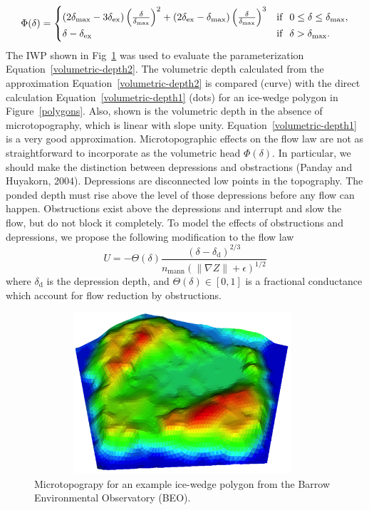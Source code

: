 \documentclass[review,11pt]{elsarticle}
\begin{document}
\begin{equation}\label{volumetric-depth2}
\Phi (\delta) =
\begin{cases} (2 \delta_\text{max} - 3 \delta_\text{ex}) \left(\frac{\delta}{\delta_\text{max}} \right )^2 + (2 \delta_\text{ex} -  \delta_\text{max}) \left(\frac{\delta}{\delta_\text{max}} \right )^3 & \text{if} \hskip 0.1in 0 \leq \delta \leq \delta_\text{max}, \\
\delta - \delta_\text{ex} & \text{if} \hskip .1in \delta > \delta_\text{max}.
\end{cases}
\end{equation}
The IWP shown in Fig~\ref{3Dpolygon40} was used to evaluate the parameterization Equation~\ref{volumetric-depth2}. The volumetric depth calculated from the approximation Equation~\ref{volumetric-depth2} is compared (curve) with the direct calculation Equation~\ref{volumetric-depth1} (dots) for an ice-wedge polygon in Figure~\ref{polygons}. Also, shown is the volumetric depth in the absence of microtopography, which is linear with slope unity. Equation~\ref{volumetric-depth1} is a very good approximation.
Microtopographic effects on the flow law are not as straightforward to incorporate as the volumetric head $\Phi(\delta)$. In particular, we should make the distinction between depressions and obstractions (Panday and Huyakorn, 2004). Depressions are disconnected low points in the topography. The ponded depth must rise above the level of those depressions before any flow can happen. Obstructions exist above the depressions and interrupt and slow the flow, but do not block it completely.
To model the effects of obstructions and depressions, we propose the following modification to the flow law
\begin{equation}
U = - \Theta(\delta) \frac{(\delta - \delta_\text{d})^{2/3}}{n_\text{mann} (\| \nabla Z \| +\epsilon)^{1/2}}
\end{equation}
where $\delta_\text{d}$ is the depression depth, and $\Theta(\delta) \in [0,1]$ is a fractional conductance which account for flow reduction by obstructions.

\begin{figure}
\centering
\includegraphics[width=11cm, height=6cm]{3DPolygonsImages/3Dpolygon40.png}
\caption{Microtopograpy for an example ice-wedge polygon from the Barrow Environmental Observatory (BEO).}
\label{3Dpolygon40}
\end{figure}
\end{document}
